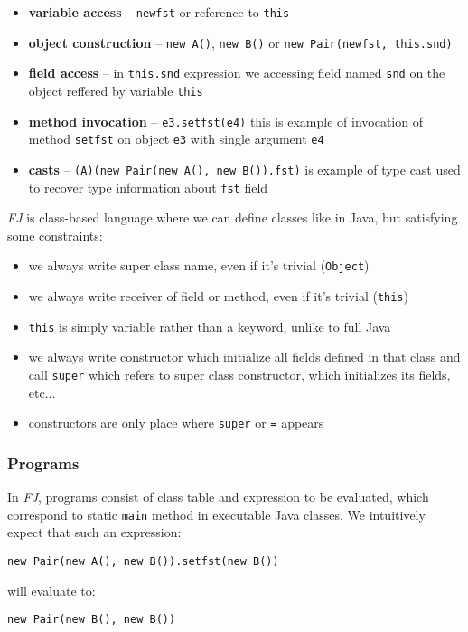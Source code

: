 \documentclass{article}[12pt]
\begin{document}
\begin{itemize}
\item{\textbf{variable access}} -- \texttt{newfst} or reference to
  \texttt{this}
\item{\textbf{object construction}} -- \texttt{new A()},
  \texttt{new B()} or \texttt{new Pair(newfst, this.snd)}
\item{\textbf{field access}} -- in \texttt{this.snd} expression we
  accessing field named \texttt{snd} on the object reffered by
  variable \texttt{this}
\item{\textbf{method invocation}} -- \texttt{e3.setfst(e4)} this
  is example of invocation of method \texttt{setfst} on object
  \texttt{e3} with single argument \texttt{e4}
\item{\textbf{casts}} -- \texttt{(A)(new Pair(new A(), new B()).fst)}
  is example of type cast used to recover type information about
  \texttt{fst} field
\end{itemize}
\emph{FJ} is class-based language where we can define classes like in
Java, but satisfying some constraints:

\begin{itemize}
\item we always write super class name, even if it's trivial
  (\texttt{Object})
\item we always write receiver of field or method, even if it's
  trivial (\texttt{this})
\item \texttt{this} is simply variable rather than a keyword, unlike
  to full Java
\item we always write constructor which initialize all fields
  defined in that class and call \texttt{super} which refers to super
  class constructor, which initializes its fields, etc...
\item constructors are only place where \texttt{super} or
  \texttt{=} appears
\end{itemize}

\subsubsection{Programs}

In \emph{FJ}, programs consist of class table and expression to be
evaluated, which correspond to static \texttt{main} method in
executable Java classes. We intuitively expect that such an
expression:

\begin{verbatim}
new Pair(new A(), new B()).setfst(new B())
\end{verbatim}
will evaluate to:
\begin{verbatim}
new Pair(new B(), new B())
\end{verbatim}
\end{document}
